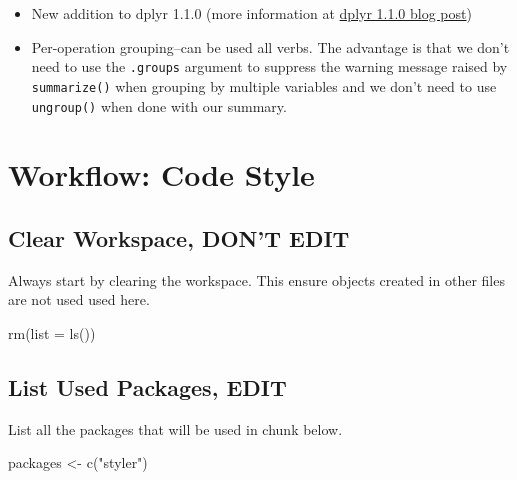 \documentclass[
  letterpaper,
  DIV=11,
  numbers=noendperiod]{scrreprt}
\newenvironment{Shaded}{\begin{snugshade}}{\end{snugshade}}
\newcommand{\AttributeTok}[1]{\textcolor[rgb]{0.40,0.45,0.13}{#1}}
\newcommand{\FunctionTok}[1]{\textcolor[rgb]{0.28,0.35,0.67}{#1}}
\newcommand{\NormalTok}[1]{\textcolor[rgb]{0.00,0.23,0.31}{#1}}
\newcommand{\OtherTok}[1]{\textcolor[rgb]{0.00,0.23,0.31}{#1}}
\newcommand{\StringTok}[1]{\textcolor[rgb]{0.13,0.47,0.30}{#1}}
\providecommand{\tightlist}{%
  \setlength{\itemsep}{0pt}\setlength{\parskip}{0pt}}\usepackage{longtable,booktabs,array}
\begin{document}
\begin{itemize}
  \begin{itemize}
  \tightlist
  \item
    New addition to dplyr 1.1.0 (more information at
    \href{https://www.tidyverse.org/blog/2023/02/dplyr-1-1-0-per-operation-grouping/}{dplyr
    1.1.0 blog post})
  \item
    Per-operation grouping--can be used all verbs. The advantage is that
    we don't need to use the \texttt{.groups} argument to suppress the
    warning message raised by \texttt{summarize()} when grouping by
    multiple variables and we don't need to use \texttt{ungroup()} when
    done with our summary.
  \end{itemize}
\end{itemize}

\chapter{Workflow: Code Style}\label{workflow-code-style}

\section*{Clear Workspace, DON'T
EDIT}\label{clear-workspace-dont-edit-5}


Always start by clearing the workspace. This ensure objects created in
other files are not used used here.

\begin{Shaded}
\begin{Highlighting}[]
\FunctionTok{rm}\NormalTok{(}\AttributeTok{list =} \FunctionTok{ls}\NormalTok{())}
\end{Highlighting}
\end{Shaded}

\section*{List Used Packages, EDIT}\label{list-used-packages-edit-5}


List all the packages that will be used in chunk below.

\begin{Shaded}
\begin{Highlighting}[]
\NormalTok{packages }\OtherTok{\textless{}{-}} \FunctionTok{c}\NormalTok{(}\StringTok{"styler"}\NormalTok{)}
\end{Highlighting}
\end{Shaded}
\end{document}
